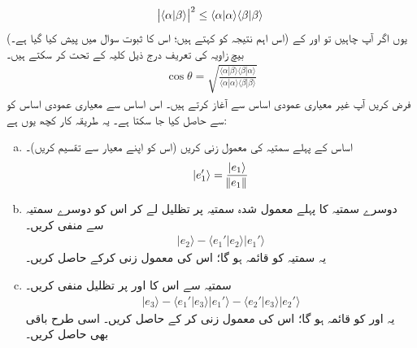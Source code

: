 
\begin{align}\label{ضمیمہ_اندرونی_ضرب_شوارز_عدم_مساوات}
\abs{\langle\alpha|\beta\rangle}^2\le \langle \alpha |\alpha \rangle \langle\beta|\beta\rangle
\end{align}
(اس  اہم نتیجہ کو  کہتے ہیں؛ اس کا ثبوت سوال  میں پیش کیا گیا ہے۔) یوں اگر آپ چاہیں تو  اور  کے بیچ زاویہ  کی تعریف درج ذیل کلیہ کے تحت کر سکتے ہیں۔
\begin{align}
\cos\theta=\sqrt{\frac{\langle\alpha|\beta\rangle\langle\beta|\alpha\rangle}{\langle\alpha|\alpha\rangle\langle\beta|\beta\rangle}}
\end{align} 
فرض کریں آپ غیر معیاری عمودی اساس   سے آغاز  کرتے  ہیں۔ اس اساس سے معیاری
 عمودی اساس     کو   سے حاصل کیا جا سکتا ہے۔ یہ طریقہ کار کچھ یوں ہے:
 \begin{enumerate}[a.]
 \item
 اساس  کے پہلے  سمتیہ کی  معمول زنی کریں  (اس کو اپنے معیار سے تقسیم کریں)۔
 \begin{align*}
 |e_1'\rangle=\frac{|e_1\rangle}{\norm{e_1}}
 \end{align*}
 \item
 دوسرے سمتیہ کا پہلے    معمول شدہ سمتیہ پر تظلیل  لے کر اس کو دوسرے سمتیہ سے منفی کریں۔
 \begin{align*}
 |e_2\rangle-\langle e_1'|e_2\rangle|e_1'\rangle
 \end{align*}
 یہ سمتیہ  کو  قائمہ  ہو گا؛ اس کی  معمول زنی کرکے    حاصل کریں۔
 \item
 سمتیہ  سے اس کا    اور  پر تظلیل منفی کریں۔
 \begin{align*}
 |e_3\rangle-\langle e_1'|e_3\rangle|e_1'\rangle-\langle e_2'|e_3\rangle|e_2'\rangle
 \end{align*}
 یہ  اور  کو قائمہ  ہو گا؛ اس کی معمول زنی کر کے    حاصل کریں۔ اسی طرح باقی بھی حاصل کریں۔
  \end{enumerate}
